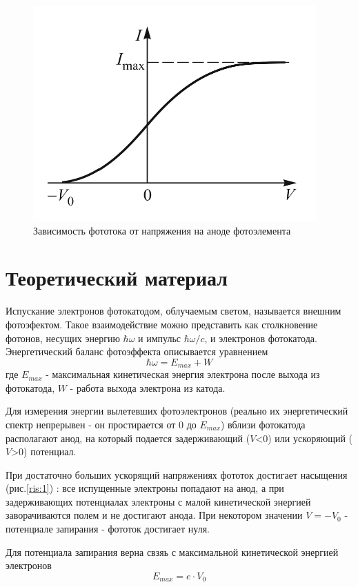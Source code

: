\documentclass[a4paper,12pt]{article}
\begin{document}
\begin{figure}
\includegraphics[scale = 0.35]{Screenshot 2023-09-06 at 9.50.13 AM.png}
\caption{Зависимость фототока от напряжения на аноде фотоэлемента}
\label{ris:1}
\end{figure}
\section{Теоретический материал \cite{1}}
Испускание электронов фотокатодом, облучаемым светом, называется внешним фотоэфектом. Такое взаимодействие можно представить как столкновение фотонов, несущих энергию $\hbar \omega$ и импульс $\hbar \omega /c$, и электронов фотокатода. Энергетический баланс фотоэффекта описывается уравнением 
\begin{equation}
    \hbar \omega = E_{max} + W
    \label{enbalance}
\end{equation}
где  $E_{max}$ - максимальная кинетическая энергия электрона после выхода из фотокатода, $W$ - работа выхода электрона из катода.


Для измерения энергии вылетевших фотоэлектронов (реально их энергетический спектр непрерывен - он простирается от 0 до $E_{max}$) вблизи фотокатода располагают анод, на который подается задерживающий ($V$<0) или ускоряющий ($V$>0) потенциал.

При достаточно больших ускорящий напряжениях фототок достигает насыщения (рис.\eqref{ris:1}) : все испущенные электроны попадают на анод, а при задерживающих потенциалах электроны с малой кинетической энергией заворачиваются полем и не достигают анода. При некотором значении $V = -V_0$ - потенциале запирания - фототок достигает нуля. 

Для потенциала запирания верна свзяь с максимальной кинетической энергией электронов 
\begin{equation}
    E_{max} = e\cdot V_0
    \label{Emax}
\end{equation}
\end{document}
